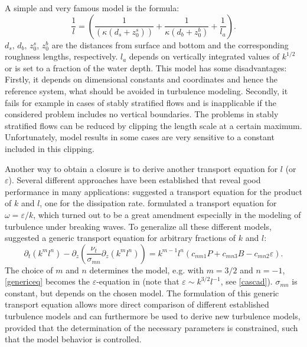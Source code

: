 A simple and very famous model is the \cite{blackadar1962} formula:
\begin{equation}
 \label{blackadar}
 \frac{1}{l} = \left( \frac{1}{(\kappa (d_s + z_0^s) )} + \frac{1}{\kappa (d_b + 
z_0^b)} + \frac{1}{l_a} \right).
\end{equation}
$d_s,\, d_b,\, z_0^s,\, z_0^b$ are the distances from surface and bottom and 
the corresponding roughness lengths, respectively. $l_a$ depends on vertically 
integrated values of $k^{1 \slash 2}$ or is set to a fraction of the water 
depth. This model has some disadvantages: Firstly, it depends on dimensional 
constants and coordinates and hence the reference system, what should be 
avoided in turbulence modeling. Secondly, it fails for example in cases of 
stably stratified flows and is inapplicable if the considered problem includes 
no vertical boundaries. The problems in stably stratified flows can be reduced 
by clipping the length scale at a certain maximum. Unfortunately, model results 
in some cases are very sensitive to a constant included in this clipping. 

Another way to obtain a closure is to derive another transport equation for $l$ 
(or $\varepsilon$). Several different approaches have been established that 
reveal good performance in many applications: \cite{mellor1982} suggested a 
transport equation for the product of $k$ and $l$, \cite{burchard1995} one for 
the dissipation rate. \cite{wilcox1998} formulated a transport equation for 
$\omega = \varepsilon \slash k$, which turned out to be a great amendment 
especially in the modeling of turbulence under breaking waves. To generalize all 
these different models, \cite{UmlaufBurchard2003a} suggested a generic transport 
equation for arbitrary fractions of $k$ and $l$: 
\begin{equation}
 \label{genericeq}
 \partial_t (k^m l^n) - \partial_z \left( \frac{\nu_t}{\sigma_{mn}} 
\partial_z(k^m l^n) \right) = k^{m-1} l^n (c_{mn1}P + c_{mn3} B - c_{mn2} 
\varepsilon ).
\end{equation}
The choice of $m$ and $n$ determines the model, e.g. with $m=3 \slash 2$ and 
$n=-1$, \eqref{genericeq} becomes the $\varepsilon$-equation in 
\cite{burchard1995} (note that $\varepsilon \sim k^{3 \slash 2} l^{-1}$, see 
\eqref{cascad}). $\sigma_{mn}$ is constant, but depends on the chosen model. The 
formulation of this generic transport equation allows more direct comparison of 
different established turbulence models and can furthermore be used to derive 
new turbulence models, provided that the determination of the necessary 
parameters is constrained, such that the model behavior is controlled.

